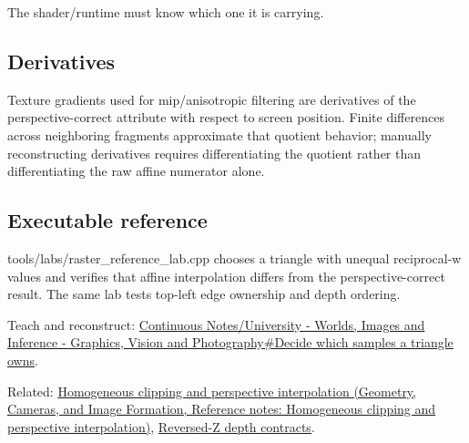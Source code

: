 The shader/runtime must know which one it is carrying.

\subsection{Derivatives}\label{appendix-1ed5f96c73ea-derivatives}

Texture gradients used for mip/anisotropic filtering are derivatives of the perspective-correct attribute with respect to screen position. Finite differences across neighboring fragments approximate that quotient behavior; manually reconstructing derivatives requires differentiating the quotient rather than differentiating the raw affine numerator alone.

\subsection{Executable reference}\label{appendix-1ed5f96c73ea-executable-reference}

tools/labs/raster\_reference\_lab.cpp chooses a triangle with unequal reciprocal-w values and verifies that affine interpolation differs from the perspective-correct result. The same lab tests top-left edge ownership and depth ordering.

Teach and reconstruct: \hyperref[03-visual-computing-i-ch012-decide-which-samples-a-triangle-owns]{Continuous Notes/University - Worlds, Images and Inference - Graphics, Vision and Photography\#Decide which samples a triangle owns}.

Related: \href{../03-Geometry-Cameras-and-Image-Formation/main.pdf\#nameddest=appendix-40426e4b2103}{Homogeneous clipping and perspective interpolation (Geometry, Cameras, and Image Formation, Reference notes: Homogeneous clipping and perspective interpolation)}, \hyperref[appendix-275ec8847057]{Reversed-Z depth contracts}.
